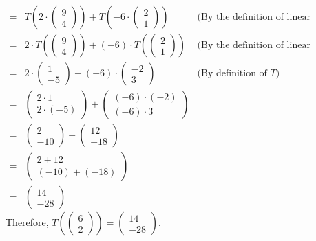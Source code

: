 \documentclass[12pt]{article}
\newenvironment{problem}[2][Problem]
{
	\begin{trivlist} 
		\item[\hskip \labelsep {\bfseries #1 #2:}]
	}
{
	\end{trivlist}
	}
\newenvironment{solution}[1][Solution]
{
	\begin{trivlist} 
		\item[\hskip \labelsep {\itshape #1:}]
	}
	{
	\end{trivlist}
}
\begin{document}
\begin{problem}{1}
\begin{solution}
\begin{align*}
=& T\left(2\cdot \begin{pmatrix}9\\4\end{pmatrix}\right) + T\left(-6 \cdot \begin{pmatrix}2\\1\end{pmatrix}\right) & \text{(By the definition of linear transformation)}\\
=& 2\cdot T\left(\begin{pmatrix}9\\4\end{pmatrix}\right) + (-6) \cdot T\left(\begin{pmatrix}2\\1\end{pmatrix}\right) & \text{(By the definition of linear transformation)}\\
=& 2\cdot \begin{pmatrix}1\\-5\end{pmatrix} + (-6) \cdot \begin{pmatrix}-2\\3\end{pmatrix} & \text{(By definition of $T$)}\\
=& \begin{pmatrix}2\cdot 1\\ 2\cdot (-5)\end{pmatrix} + \begin{pmatrix}(-6) \cdot (-2)\\(-6) \cdot 3\end{pmatrix} &\\
=& \begin{pmatrix}2\\ -10\end{pmatrix} + \begin{pmatrix}12\\-18\end{pmatrix} &\\
=& \begin{pmatrix}2 +12 \\ (-10) + (-18) \end{pmatrix} & \\
=& \begin{pmatrix} 14 \\ -28 \end{pmatrix} &
\end{align*}
Therefore, $T\left(\begin{pmatrix}6\\2\end{pmatrix}\right) =\begin{pmatrix} 14 \\ -28 \end{pmatrix}$.

\end{solution}
\end{problem}
\end{document}
